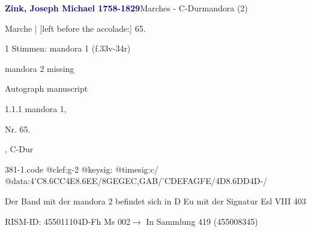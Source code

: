 \documentclass[twocolumn]{book}
\begin{document}
\par \vspace{7pt} \textcolor{darkblue}{\textbf{Zink, Joseph Michael  1758-1829}}\hfillplus{\textbf{[381]}}\newline Marches - C-Dur\newline mandora (2)
\par \begin{itshape}[f.33v, at left:] Marche | [left before the accolade:] 65.\end{itshape} 
\par \textcolor{darkblue}{}  1 Stimmen: mandora 1  (f.33v-34r)\newline \begin{small} mandora 2 missing\end{small} \newline Autograph manuscript
\par 1.1.1  mandora 1, \begin{itshape}Nr. 65.\end{itshape}, C-Dur  
\begin{filecontents*}{381-1.code}
@clef:g-2
@keysig:
@timesig:c/
@data:4'C{8.6CC}4E{8.6EE}/{8GEGE}{C,GAB}/{'CDEF}{AGFE}/4D{8.6DD}4D-/
\end{filecontents*}
\newline
%
\par Der Band mit der mandora 2 befindet sich in D Eu mit der Signatur Esl VIII 403
\par RISM-ID: 455011104\newline D-Fh  Ms 002\newline $\rightarrow$ In Sammlung 419 (455008345)
      
\end{document}
